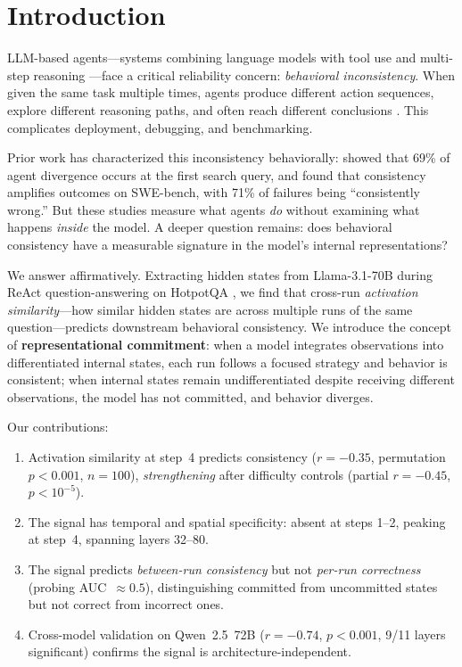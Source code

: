 \documentclass{article}
\begin{document}
\section{Introduction}

LLM-based agents---systems combining language models with tool use and multi-step reasoning \citep{react, cot}---face a critical reliability concern: \emph{behavioral inconsistency}. When given the same task multiple times, agents produce different action sequences, explore different reasoning paths, and often reach different conclusions \citep{mehta2026agents, mehta2026consistency}. This complicates deployment, debugging, and benchmarking.

Prior work has characterized this inconsistency behaviorally: \citet{mehta2026agents} showed that 69\% of agent divergence occurs at the first search query, and \citet{mehta2026consistency} found that consistency amplifies outcomes on SWE-bench, with 71\% of failures being ``consistently wrong.'' But these studies measure what agents \emph{do} without examining what happens \emph{inside} the model. A deeper question remains: does behavioral consistency have a measurable signature in the model's internal representations?

We answer affirmatively. Extracting hidden states from Llama-3.1-70B \citep{llama3} during ReAct \citep{react} question-answering on HotpotQA \citep{hotpotqa}, we find that cross-run \emph{activation similarity}---how similar hidden states are across multiple runs of the same question---predicts downstream behavioral consistency. We introduce the concept of \textbf{representational commitment}: when a model integrates observations into differentiated internal states, each run follows a focused strategy and behavior is consistent; when internal states remain undifferentiated despite receiving different observations, the model has not committed, and behavior diverges.

Our contributions:
\begin{enumerate}
    \item Activation similarity at step~4 predicts consistency ($r = -0.35$, permutation $p < 0.001$, $n{=}100$), \emph{strengthening} after difficulty controls (partial $r = -0.45$, $p < 10^{-5}$).
    \item The signal has temporal and spatial specificity: absent at steps 1--2, peaking at step~4, spanning layers 32--80.
    \item The signal predicts \emph{between-run consistency} but not \emph{per-run correctness} (probing AUC~$\approx 0.5$), distinguishing committed from uncommitted states but not correct from incorrect ones.
    \item Cross-model validation on Qwen~2.5~72B ($r = -0.74$, $p < 0.001$, 9/11 layers significant) confirms the signal is architecture-independent.
\end{enumerate}
\end{document}
